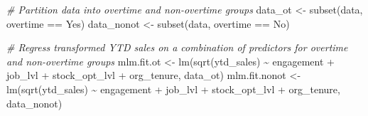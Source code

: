 \documentclass[
]{book}
\newenvironment{Shaded}{\begin{snugshade}}{\end{snugshade}}
\newcommand{\CommentTok}[1]{\textcolor[rgb]{0.56,0.35,0.01}{\textit{#1}}}
\newcommand{\FunctionTok}[1]{\textcolor[rgb]{0.00,0.00,0.00}{#1}}
\newcommand{\NormalTok}[1]{#1}
\newcommand{\OtherTok}[1]{\textcolor[rgb]{0.56,0.35,0.01}{#1}}
\newcommand{\SpecialCharTok}[1]{\textcolor[rgb]{0.00,0.00,0.00}{#1}}
\newcommand{\StringTok}[1]{\textcolor[rgb]{0.31,0.60,0.02}{#1}}
\begin{document}
\begin{Shaded}
\begin{Highlighting}[]
\CommentTok{\# Partition data into overtime and non{-}overtime groups}
\NormalTok{data\_ot }\OtherTok{\textless{}{-}} \FunctionTok{subset}\NormalTok{(data, overtime }\SpecialCharTok{==} \StringTok{\textquotesingle{}Yes\textquotesingle{}}\NormalTok{)}
\NormalTok{data\_nonot }\OtherTok{\textless{}{-}} \FunctionTok{subset}\NormalTok{(data, overtime }\SpecialCharTok{==} \StringTok{\textquotesingle{}No\textquotesingle{}}\NormalTok{)}

\CommentTok{\# Regress transformed YTD sales on a combination of predictors for overtime and non{-}overtime groups}
\NormalTok{mlm.fit.ot }\OtherTok{\textless{}{-}} \FunctionTok{lm}\NormalTok{(}\FunctionTok{sqrt}\NormalTok{(ytd\_sales) }\SpecialCharTok{\textasciitilde{}}\NormalTok{ engagement }\SpecialCharTok{+}\NormalTok{ job\_lvl }\SpecialCharTok{+}\NormalTok{ stock\_opt\_lvl }\SpecialCharTok{+}\NormalTok{ org\_tenure, data\_ot)}
\NormalTok{mlm.fit.nonot }\OtherTok{\textless{}{-}} \FunctionTok{lm}\NormalTok{(}\FunctionTok{sqrt}\NormalTok{(ytd\_sales) }\SpecialCharTok{\textasciitilde{}}\NormalTok{ engagement }\SpecialCharTok{+}\NormalTok{ job\_lvl }\SpecialCharTok{+}\NormalTok{ stock\_opt\_lvl }\SpecialCharTok{+}\NormalTok{ org\_tenure, data\_nonot)}
\end{Highlighting}
\end{Shaded}

\providecommand{\docline}[3]{\noalign{\global\setlength{\arrayrulewidth}{#1}}\arrayrulecolor[HTML]{#2}\cline{#3}}

\setlength{\tabcolsep}{2pt}

\renewcommand*{\arraystretch}{1.5}
\end{document}
